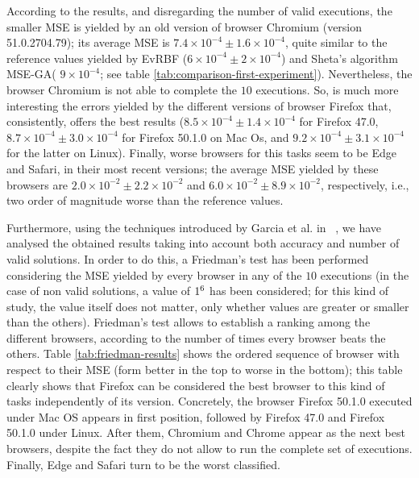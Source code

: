 \documentclass{article}
\begin{document}
According to the results, and disregarding the number of valid
executions, the smaller MSE is yielded by an old version of browser
Chromium (version 51.0.2704.79); its average MSE is $7.4 \times
10^{-4} \pm 1.6 \times 10^{-4}$, quite similar to the reference values
yielded by EvRBF (${6 \times 10^{-4} \pm 2 \times 10^{-4}}$) and
Sheta's algorithm MSE-GA( $9 \times 10^{-4}$; see table
\ref{tab:comparison-first-experiment}). Nevertheless, the browser
Chromium is not able to complete the $10$ executions. So, is much more
interesting the errors yielded by the different versions of browser
Firefox that, consistently, offers the best results ($8.5 \times
10^{-4}	 \pm 	1.4 \times 10^{-4}$ for Firefox 47.0, $8.7 \times
10^{-4}	 \pm 	3.0 \times 10^{-4}$ for Firefox 50.1.0 on Mac Os, and
$9.2 \times 10^{-4}	 \pm 	3.1 \times 10^{-4}$	for the latter
on Linux).  Finally, worse browsers for this tasks seem to be Edge and
Safari, in their most recent versions; the average MSE yielded by
these browsers are $2.0 \times 10^{-2}	 \pm	2.2 \times 10^{-2}$
and  $6.0 \times 10^{-2}	\pm 	8.9 \times 10^{-2}$,
respectively, i.e., two order of magnitude worse than the reference
values.

Furthermore, using the techniques introduced by Garcia et al. in ~\cite{Garcia2009}, we have analysed the obtained results taking into account both accuracy and number of
valid solutions. In order to do this, a Friedman's test has been performed
considering the MSE yielded by every browser in any of the $10$
executions (in the case of non valid solutions, a value of
$1\time10^6$ has been considered; for this kind of study, the value
itself does not matter, only whether values are greater or smaller than
the others).  Friedman's test allows to establish a ranking among the
different browsers, according to the number of times every browser
beats the others. Table \ref{tab:friedman-results} shows the ordered
sequence of browser with respect to their MSE (form better in the top
to worse in the bottom); this table clearly shows that Firefox can be
considered the best browser to this kind of tasks independently of its
version. Concretely, the browser Firefox 50.1.0 executed under Mac OS
appears in first position, followed by Firefox 47.0 and Firefox 50.1.0
under Linux. After them, Chromium and Chrome appear as the next best
browsers, despite the fact they do not allow to run the complete set
of executions. Finally, Edge and Safari turn to be the worst
classified.
\end{document}
